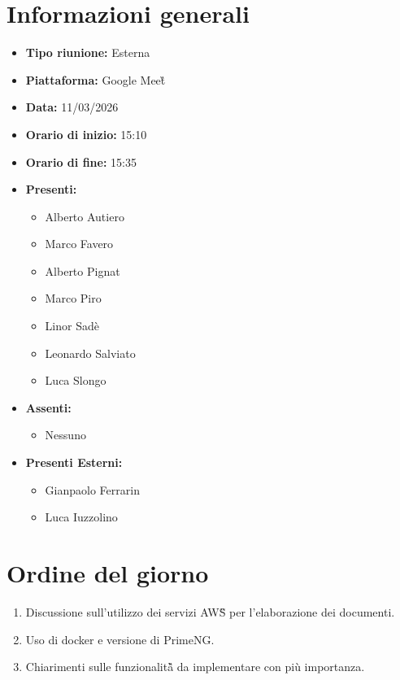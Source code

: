 \documentclass[a4paper,12pt]{article}
\begin{document}
\newpage

\tableofcontents
\newpage

\section{Informazioni generali}

\begin{itemize}
    \item \textbf{Tipo riunione:} Esterna
    \item \textbf{Piattaforma:} Google Meet\G{}
    \item \textbf{Data:} 11/03/2026
    \item \textbf{Orario di inizio:} 15:10
    \item \textbf{Orario di fine:} 15:35
    \item \textbf{Presenti:}
    \begin{itemize}[leftmargin=1.5em, itemsep=3pt, label={\rule[0.5ex]{0.4em}{0.4em}}]
        \item Alberto Autiero
        \item Marco Favero
        \item Alberto Pignat
        \item Marco Piro
        \item Linor Sadè
        \item Leonardo Salviato
        \item Luca Slongo
    \end{itemize}
    \item \textbf{Assenti:} 
    \begin{itemize}[leftmargin=1.5em, itemsep=3pt, label={\rule[0.5ex]{0.4em}{0.4em}}]
    \item Nessuno
    \end{itemize}
    \item \textbf{Presenti Esterni:}
    \begin{itemize}[leftmargin=1.5em, itemsep=3pt, label={\rule[0.5ex]{0.4em}{0.4em}}]
      \item Gianpaolo Ferrarin
      \item Luca Iuzzolino
    \end{itemize}
\end{itemize}

\section{Ordine del giorno}

\begin{enumerate}
    \item \label{itm:AI} Discussione sull'utilizzo dei servizi AWS\G{} per l'elaborazione dei documenti.
    \item \label{itm:arch} Uso di docker e versione di PrimeNG.
    \item \label{itm:dev} Chiarimenti sulle funzionalità\G{} da implementare con più importanza.
\end{enumerate}
\end{document}
